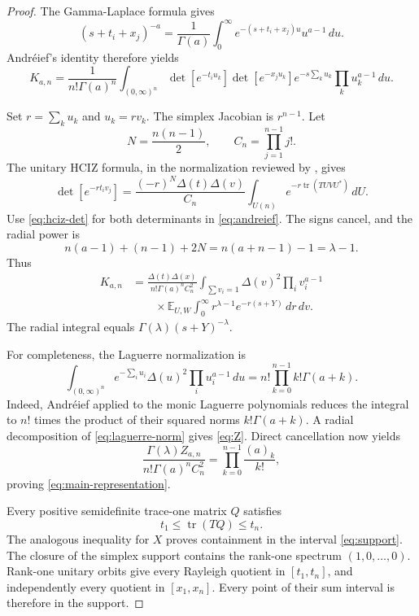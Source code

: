 \documentclass[11pt]{article}
\theoremstyle{definition}
\theoremstyle{remark}
\newcommand{\E}{\mathbb{E}}
\newcommand{\tr}{\operatorname{tr}}
\begin{document}
\begin{proof}
The Gamma-Laplace formula gives
\[
(s+t_i+x_j)^{-a}
=\frac{1}{\Gamma(a)}\int_0^\infty
e^{-(s+t_i+x_j)u}u^{a-1}\,du.
\]
Andr\'eief's identity therefore yields
\begin{equation}\label{eq:andreief}
K_{a,n}
=\frac{1}{n!\Gamma(a)^n}
\int_{(0,\infty)^n}
\det[e^{-t_i u_k}]\det[e^{-x_j u_k}]
e^{-s\sum_k u_k}\prod_k u_k^{a-1}\,du.
\end{equation}

Set $r=\sum_k u_k$ and $u_k=rv_k$. The simplex Jacobian is $r^{n-1}$.
Let
\[
N=\frac{n(n-1)}2,\qquad C_n=\prod_{j=1}^{n-1}j!.
\]
The unitary HCIZ formula, in the normalization reviewed by
\citet{McSwiggen2020}, gives
\begin{equation}\label{eq:hciz-det}
\det[e^{-rt_i v_j}]
=\frac{(-r)^N\Delta(t)\Delta(v)}{C_n}
\int_{U(n)}e^{-r\tr(TUVU^*)}\,dU.
\end{equation}
Use \eqref{eq:hciz-det} for both determinants in
\eqref{eq:andreief}. The signs cancel, and the radial power is
\[
n(a-1)+(n-1)+2N
=n(a+n-1)-1
=\lambda-1.
\]
Thus
\begin{align}
K_{a,n}
&=\frac{\Delta(t)\Delta(x)}{n!\Gamma(a)^nC_n^2}
\int_{\sum v_i=1}\Delta(v)^2\prod_i v_i^{a-1}\nonumber\\
&\qquad\times
\E_{U,W}\int_0^\infty r^{\lambda-1}e^{-r(s+Y)}\,dr\,dv.
\label{eq:radialized}
\end{align}
The radial integral equals $\Gamma(\lambda)(s+Y)^{-\lambda}$.

For completeness, the Laguerre normalization is
\begin{equation}\label{eq:laguerre-norm}
\int_{(0,\infty)^n}e^{-\sum_i u_i}\Delta(u)^2
\prod_i u_i^{a-1}\,du
=n!\prod_{k=0}^{n-1}k!\Gamma(a+k).
\end{equation}
Indeed, Andr\'eief applied to the monic Laguerre polynomials reduces the
integral to $n!$ times the product of their squared norms
$k!\Gamma(a+k)$. A radial decomposition of
\eqref{eq:laguerre-norm} gives \eqref{eq:Z}. Direct cancellation now yields
\[
\frac{\Gamma(\lambda)Z_{a,n}}
{n!\Gamma(a)^nC_n^2}
=\prod_{k=0}^{n-1}\frac{(a)_k}{k!},
\]
proving \eqref{eq:main-representation}.

Every positive semidefinite trace-one matrix $Q$ satisfies
\[
t_1\le\tr(TQ)\le t_n.
\]
The analogous inequality for $X$ proves containment in the interval
\eqref{eq:support}. The closure of the simplex support contains the rank-one
spectrum $(1,0,\ldots,0)$. Rank-one unitary orbits give every Rayleigh
quotient in $[t_1,t_n]$, and independently every quotient in $[x_1,x_n]$.
Every point of their sum interval is therefore in the support.


\end{proof}
\end{document}
